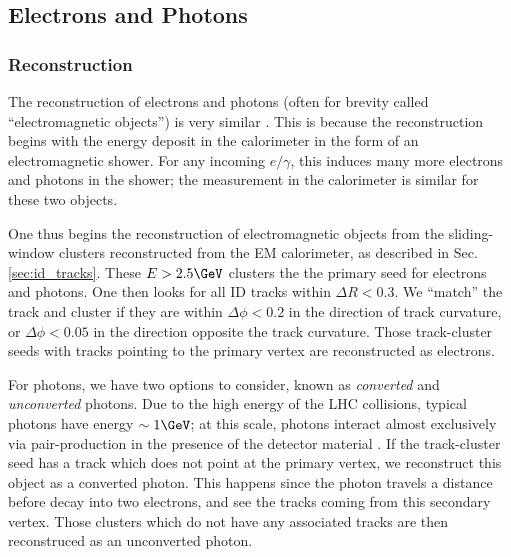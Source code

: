 
\subsection{Electrons and Photons}

\subsubsection{Reconstruction}
The reconstruction of electrons and photons (often for brevity called ``electromagnetic objects'') is very similar \cite{Aaboud:2016yuq,PERF-2013-05, PERF-2013-03 }.
This is because the reconstruction begins with the energy deposit in the calorimeter in the form of an electromagnetic shower.
For any incoming $e/\gamma$, this induces many more electrons and photons in the shower; the measurement in the calorimeter is similar for these two objects.

One thus begins the reconstruction of electromagnetic objects from the sliding-window clusters reconstructed from the EM calorimeter, as described in Sec.\ref{sec:id_tracks}.
These $E > 2.5 \GeV$ clusters the the primary seed for electrons and photons.
One then looks for all ID tracks within $\Delta R < 0.3$.
We ``match'' the track and cluster if they are within $\Delta \phi < 0.2$ in the direction of track curvature, or $\Delta \phi < 0.05$ in the direction opposite the track curvature.
Those track-cluster seeds with tracks pointing to the primary vertex are reconstructed as electrons.

For photons, we have two options to consider, known as \textit{converted} and \textit{unconverted} photons.
Due to the high energy of the LHC collisions, typical photons have energy $\order 1 \GeV$; at this scale, photons interact almost exclusively via pair-production in the presence of the detector material .
If the track-cluster seed has a track which does not point at the primary vertex, we reconstruct this object as a converted photon.
This happens since the photon travels a distance before decay into two electrons, and see the tracks coming from this secondary vertex.
Those clusters which do not have any associated tracks are then reconstruced as an unconverted photon.

